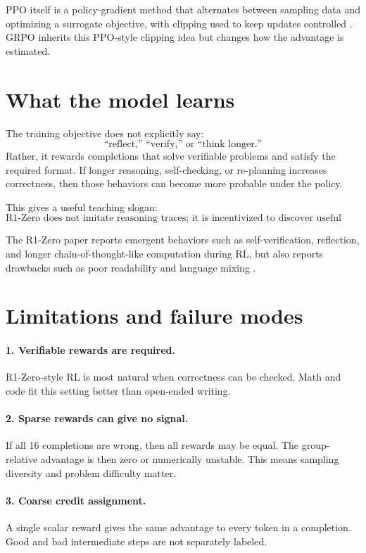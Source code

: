 \documentclass[11pt]{article}
\begin{document}
PPO itself is a policy-gradient method that alternates between sampling data and optimizing a surrogate objective, with clipping used to keep updates controlled \cite{schulman2017ppo}. GRPO inherits this PPO-style clipping idea but changes how the advantage is estimated.

\section{What the model learns}

The training objective does not explicitly say:
\[
\text{``reflect,'' ``verify,'' or ``think longer.''}
\]
Rather, it rewards completions that solve verifiable problems and satisfy the required format. If longer reasoning, self-checking, or re-planning increases correctness, then those behaviors can become more probable under the policy.

This gives a useful teaching slogan:
\[
\boxed{\text{R1-Zero does not imitate reasoning traces; it is incentivized to discover useful reasoning behavior.}}
\]

The R1-Zero paper reports emergent behaviors such as self-verification, reflection, and longer chain-of-thought-like computation during RL, but also reports drawbacks such as poor readability and language mixing \cite{guo2025r1}.

\section{Limitations and failure modes}

\paragraph{1. Verifiable rewards are required.}
R1-Zero-style RL is most natural when correctness can be checked. Math and code fit this setting better than open-ended writing.

\paragraph{2. Sparse rewards can give no signal.}
If all 16 completions are wrong, then all rewards may be equal. The group-relative advantage is then zero or numerically unstable. This means sampling diversity and problem difficulty matter.

\paragraph{3. Coarse credit assignment.}
A single scalar reward gives the same advantage to every token in a completion. Good and bad intermediate steps are not separately labeled.
\end{document}
